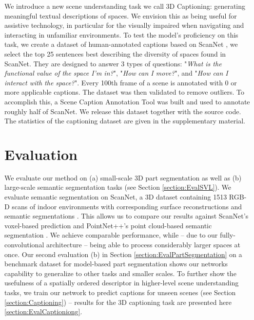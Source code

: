 \documentclass[runningheads]{llncs}
\begin{document}
We introduce a new scene understanding task we call 3D Captioning: generating meaningful textual descriptions of spaces. We envision this as being useful for assistive technology, in particular for the visually impaired when navigating and interacting in unfamiliar environments. To test the model's proficiency on this task, we create a dataset of human-annotated captions based on ScanNet \cite{Dai2017}, we select the top 25 sentences best describing the diversity of spaces found in ScanNet. They are designed to answer 3 types of questions: "\textit{What is the functional value of the space I'm in?}", "\textit{How can I move?}", and "\textit{How can I interact with the space?}". Every 100th frame of a scene is annotated with 0 or more applicable captions. The dataset was then validated to remove outliers. To accomplish this, a Scene Caption Annotation Tool was built and used to annotate roughly half of ScanNet. We release this dataset together with the source code. The statistics of the captioning dataset are given in the supplementary material. 

\section{Evaluation}









We evaluate our method on (a) small-scale 3D part segmentation as well as (b) large-scale semantic segmentation tasks (see Section \ref{section:EvalSVL}). We evaluate semantic segmentation on ScanNet, a 3D dataset containing 1513 RGB-D scans of indoor environments with corresponding surface reconstructions and semantic segmentations \cite{Dai2017}. This allows us to compare our results against ScanNet's voxel-based prediction \cite{Dai2017} and PointNet++'s point cloud-based semantic segmentation \cite{Qi2017_2}. We achieve comparable performance, while -- due to our fully-convolutional architecture -- being able to process considerably larger spaces at once. Our second evaluation (b) in Section \ref{section:EvalPartSegmentation} on a benchmark dataset for model-based part segmentation shows our networks capability to generalize to other tasks and smaller scales. To further show the usefulness of a spatially ordered descriptor in higher-level scene understanding tasks, we train our network to predict captions for unseen scenes (see Section \ref{section:Captioning}) -- results for the 3D captioning task are presented here \ref{section:EvalCaptioniong}. 
\end{document}
